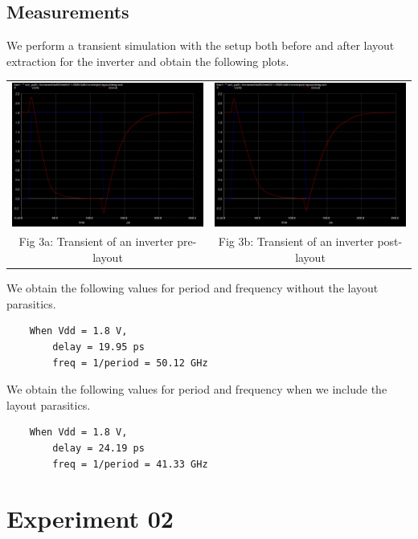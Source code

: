 \documentclass[12pt,a4paper]{article}
\begin{document}
\subsection{Measurements}
\noindent We perform a transient simulation with the setup both before and after layout extraction for the inverter and obtain the following plots.
\begin{center}
\begin{tabular}{cc}
     \includegraphics[width=0.47\linewidth]{tut5/reports/media/inv.pre-layout.png} &
     \includegraphics[width=0.47\linewidth]{tut5/reports/media/inv.post-layout.png} \\
     Fig 3a: Transient of an inverter pre-layout & Fig 3b: Transient of an inverter post-layout
\end{tabular}
\end{center}
\noindent We obtain the following values for period and frequency without the layout parasitics.
\begin{verbatim}
    When Vdd = 1.8 V,
        delay = 19.95 ps
        freq = 1/period = 50.12 GHz
\end{verbatim}
\noindent We obtain the following values for period and frequency when we include the layout parasitics.
\begin{verbatim}
    When Vdd = 1.8 V,
        delay = 24.19 ps
        freq = 1/period = 41.33 GHz
\end{verbatim}

\section{Experiment 02}
\end{document}
